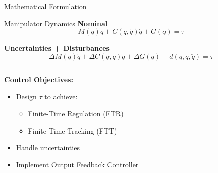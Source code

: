 \begin{frame}
	\sectionpage
\end{frame}

\begin{frame}{Mathematical Formulation}
  \begin{block}{Manipulator Dynamics}
    \textbf{Nominal}
    $$ M(q)\ddot{q} + C(q,\dot{q})\dot{q} + G(q) = \tau $$
    
    \textbf{Uncertainties + Disturbances}
    $$ \Delta M(q)\ddot{q} + \Delta C(q, \dot{q})\dot{q} + \Delta G(q) + d(q,\dot{q}, \ddot{q}) = \tau $$
  \end{block}

  \begin{columns}
    \begin{column}{0.5\textwidth}
      \textbf{Control Objectives:}
      \begin{itemize}
        \item<1-| structure@1> Design $\tau$ to achieve:
          \begin{itemize}
            \item Finite-Time Regulation (FTR) 
            \item Finite-Time Tracking (FTT)
          \end{itemize}
        \item<2-| structure@2> Handle uncertainties
        \item<3-| structure@3> Implement Output Feedback Controller
      \end{itemize}
    \end{column} 
    \begin{column}{0.5\textwidth}
      \end{column}
  \end{columns}
\end{frame}

